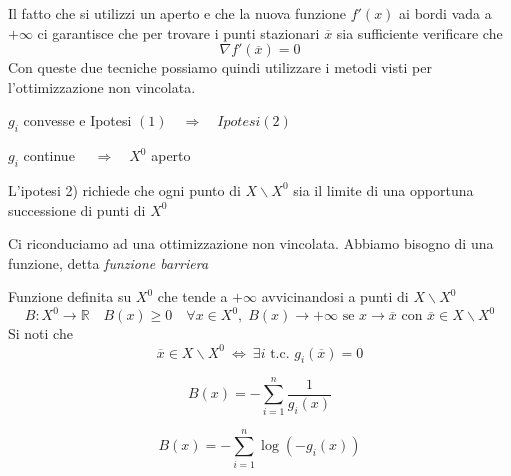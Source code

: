   Il fatto che si utilizzi un aperto e che la nuova funzione $f'(x)$ ai bordi vada a $+\infty$ ci garantisce che per trovare i punti stazionari $\overline{x}$ sia sufficiente verificare che
 $$ \nabla f'(\overline{x}) = 0$$
 Con queste due tecniche possiamo quindi utilizzare i metodi visti per l'ottimizzazione non vincolata.
 

\begin{observation}
  $ g_i$ convesse e Ipotesi $(1) \quad 
\Rightarrow \quad  Ipotesi (2)$
\end{observation}

\begin{observation}
$g_i$ continue $ \quad \Rightarrow \quad X^{0}  $ aperto
\end{observation}
L'ipotesi 2) richiede che ogni punto di $X \backslash X^{0}$ sia
il limite di una opportuna successione di punti di $X^{0}$

Ci riconduciamo ad una ottimizzazione non vincolata.
Abbiamo bisogno di una funzione, detta \emph{funzione barriera}

\begin{defn}
Funzione definita su $X^{0}$ che tende a $+ \infty$  avvicinandosi
a punti di $X\backslash X^{0}$
$$ B:X^{0} \rightarrow \mathbb{R} \quad
B(x)\geq 0 \quad \forall x \in X^{0},
\; B(x) \to +\infty \text{ se } x \rightarrow \overline{x}
\text{ con } \overline{x} \in X\backslash X^{0}
$$
Si noti che 
$$\overline{x} \in X\backslash X^{0} ~ \Longleftrightarrow ~ \exists i \text{ t.c. } g_i(\overline{x}) = 0$$
\end{defn}

\begin{defn}
$$ B(x) = - \displaystyle \sum_{i=1}^{n} \dfrac{1}{g_i(x)} $$
\end{defn}

\begin{defn}
$$ B(x) = - \displaystyle \sum_{i=1}^{n} \log(-g_i(x)) $$
\end{defn}

